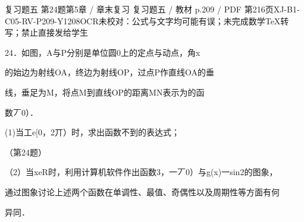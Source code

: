 \begin{bankitem}{复习题五 第24题}{第5章 / 章末复习 复习题五 / 教材 p.209 / PDF 第216页}{XJ-B1-C05-RV-P209-Y1208}{OCR未校对：公式与文字均可能有误；未完成数学TeX转写；禁止直接发给学生}
\begin{ocrdraft}
\par
24．如图，A与P分别是单位圆0上的定点与动点，角x
\par
的始边为射线OA，终边为射线OP，过点P作直线OA的垂
\par
线，垂足为M，将点M到直线OP的距离MN表示为的函
\par
数丆0）．
\par
(1)当工e[0，2丌）时，求出函数不到的表达式；
\par
（第24题）
\par
（2）当xeR时，利用计算机软件作出函数3，一丆0）与g(x)一sin2的图象，
\par
通过图象讨论上述两个函数在单调性、最值、奇偶性以及周期性等方面有何
\par
异同．
\end{ocrdraft}
\end{bankitem}
